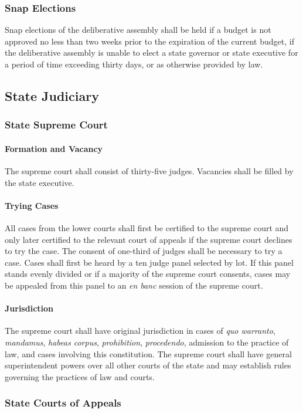 \documentclass{article}
\begin{document}
\subsubsection{Snap Elections}
Snap elections of the deliberative assembly shall be held if a budget is not approved no less than two weeks prior to the expiration of the current budget, if the deliberative assembly is unable to elect a state governor or state executive for a period of time exceeding thirty days, or as otherwise provided by law.
\subsection{State Judiciary}
\subsubsection{State Supreme Court}
\paragraph{Formation and Vacancy}
The supreme court shall consist of thirty-five judges. Vacancies shall be filled by the state executive.
\paragraph{Trying Cases}
All cases from the lower courts shall first be certified to the supreme court and only later certified to the relevant court of appeals if the supreme court declines to try the case. The consent of one-third of judges shall be necessary to try a case. Cases shall first be heard by a ten judge panel selected by lot. If this panel stands evenly divided or if a majority of the supreme court consents, cases may be appealed from this panel to an \textit{en banc} session of the supreme court.
\paragraph{Jurisdiction}
The supreme court shall have original jurisdiction in cases of \textit{quo warranto}, \textit{mandamus}, \textit{habeas corpus}, \textit{prohibition}, \textit{procedendo}, admission to the practice of law, and cases involving this constitution. The supreme court shall have general superintendent powers over all other courts of the state and may establish rules governing the practices of law and courts.
\subsubsection{State Courts of Appeals}
\end{document}
